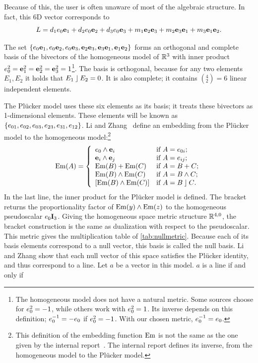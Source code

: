 Because of this, the user is often unaware of most of the algebraic structure.  In fact, this 6D vector corresponds to
\begin{equation*}
  L = d_1 e_0\mathbf{e}_1 + d_2 e_0\mathbf{e}_2 + d_3 e_0\mathbf{e}_3 + m_1 \mathbf{e}_2\mathbf{e}_3 + m_2 \mathbf{e}_3\mathbf{e}_1 + m_3 \mathbf{e}_1\mathbf{e}_2 .
\end{equation*}

The set $\{e_0\mathbf{e}_1, e_0\mathbf{e}_2, e_0\mathbf{e}_3, \mathbf{e}_2\mathbf{e}_3, \mathbf{e}_3\mathbf{e}_1, \mathbf{e}_1\mathbf{e}_2\}$ forms an orthogonal and complete basis of the bivectors of the homogeneous model of $\mathbb{R}^3$ with inner product $e_0^2 = \mathbf{e}_1^2 = \mathbf{e}_2^2 = \mathbf{e}_3^2 = 1$\footnote{The homogeneous model does not have a natural metric.  Some sources choose for $e_0^2 = -1$, while others work with $e_0^2 = 1$.  Its inverse depends on this definition; $e_0^{-1} = -e_0$ if $e_0^2 = -1$.  With our chosen metric, $e_0^{-1} = e_0$.}.  The basis is orthogonal, because for any two elements $E_1, E_2$ it holds that $E_1 \mathbin{\rfloor} E_2 = 0$. It is also complete; it contains $(^4_2) = 6$ linear independent elements.

The Pl\"ucker model uses these six elements as its basis; it treats these bivectors as 1-dimensional elements.  These elements will be known as $\{e_{01}, e_{02}, e_{03}, e_{23}, e_{31}, e_{12}\}$.  Li and Zhang~\cite{Hongbo} define an embedding from the Pl\"ucker model to the homogeneous model:\footnote{This definition of the embedding function $\operatorname{Em}$ is not the same as the one given by the internal report~\cite{internal}.  The internal report defines its inverse, from the homogeneous model to the Pl\"ucker model.}
\begin{equation} \label{eq:Em}
  \operatorname{Em}(A) = \left\{ 
    \begin{array}{ll}
      e_0 \wedge \mathbf{e}_i &\mbox{if $A = e_{0i}$}; \\
      \mathbf{e}_i \wedge \mathbf{e}_j &\mbox{if $A = e_{ij}$}; \\
      \operatorname{Em}(B) + \operatorname{Em}(C) &\mbox{if $A = B + C$}; \\
      \operatorname{Em}(B) \wedge \operatorname{Em}(C) &\mbox{if $A = B \wedge C$}; \\
      \left[\operatorname{Em}(B) \wedge \operatorname{Em}(C)\right] &\mbox{if $A = B \mathbin{\rfloor} C$}. \\
    \end{array}
    \right.
\end{equation}
In the last line, the inner product for the Pl\"ucker model is defined.  The bracket returns the proportionality factor of $\operatorname{Em}(y) \wedge \operatorname{Em}(z)$ to the homogeneous pseudoscalar $e_0\mathbf{I}_3$.  Giving the homogeneous space metric structure $\mathbb{R}^{4,0}$, the bracket construction is the same as dualization with respect to the pseudoscalar.  This metric gives the multiplication table of \autoref{tab:nullmetric}.  Because each of its basis elements correspond to a null vector, this basis is called the null basis.  Li and Zhang show that each null vector of this space satisfies the Pl\"ucker identity, and thus correspond to a line.  Let $a$ be a vector in this model.  $a$ is a line if and only if


